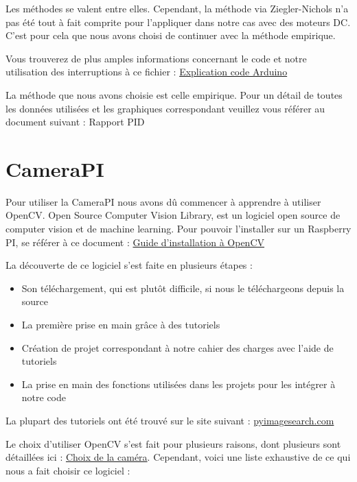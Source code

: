\documentclass[
	a4paper,									%
	11pt,										%
	twoside,									%
	openright,									%
	notitlepage,									%
	parskip=half,								%
]{scrreprt}										%
\begin{document}
Les méthodes se valent entre elles. Cependant, la méthode via Ziegler-Nichols n'a pas été tout à fait comprite pour l'appliquer 
dans notre cas avec des moteurs DC. C'est pour cela que nous avons choisi de continuer avec la méthode empirique. \par


Vous trouverez de plus amples informations concernant le code et notre utilisation des interruptions
à ce fichier : \href{run:./Code_Arduino.pdf}{Explication code Arduino}

La méthode que nous avons choisie est celle empirique. Pour un détail de toutes les données utilisées 
et les graphiques correspondant veuillez vous référer au document suivant : Rapport PID \par



\section{CameraPI}

Pour utiliser la CameraPI nous avons dû commencer à apprendre à utiliser OpenCV. 
Open Source Computer Vision Library, est un logiciel open source de computer vision et de machine learning. 
Pour pouvoir l'installer sur un Raspberry PI, se référer à ce document : \href{run:./Installation_OpenCV.pdf}{Guide d'installation à OpenCV}\par

La découverte de ce logiciel s'est faite en plusieurs étapes : 

\begin{itemize}
	\item Son téléchargement, qui est plutôt difficile, si nous le téléchargeons depuis la source
	\item La première prise en main grâce à des tutoriels
	\item Création de projet correspondant à notre cahier des charges avec l'aide de tutoriels
	\item La prise en main des fonctions utilisées dans les projets pour les intégrer à notre code
\end{itemize}

La plupart des tutoriels ont été trouvé sur le site suivant : \href{https://pyimagesearch.com/}{pyimagesearch.com} \par

Le choix d'utiliser OpenCV s'est fait pour plusieurs raisons, dont plusieurs sont détaillées ici : \href{run:./Choix_Camera.pdf}{Choix de la caméra}. 
Cependant, voici une liste exhaustive de ce qui nous a fait choisir ce logiciel :
\end{document}
